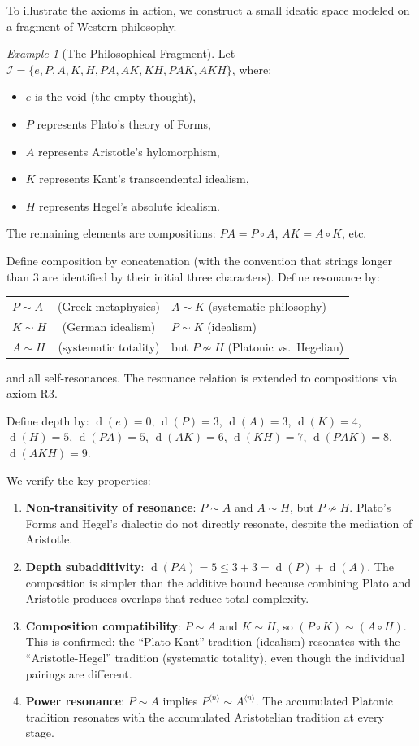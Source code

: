 \documentclass[11pt,openany]{book}
\theoremstyle{definition}
\theoremstyle{plain}
\theoremstyle{remark}
\newtheorem{example}[axiom]{Example}
\newcommand{\IS}{\mathcal{I}}               %
\newcommand{\compose}{\circ}                 %
\newcommand{\res}{\sim}                      %
\newcommand{\depth}{\operatorname{d}}       %
\newcommand{\compN}[2]{#1^{\langle #2 \rangle}} %
\begin{document}
To illustrate the axioms in action, we construct a small ideatic space modeled on a fragment of Western philosophy.

\begin{example}[The Philosophical Fragment]
\label{ex:philosophy}
Let $\IS = \{e, P, A, K, H, PA, AK, KH, PAK, AKH\}$, where:
\begin{itemize}
\item $e$ is the void (the empty thought),
\item $P$ represents Plato's theory of Forms,
\item $A$ represents Aristotle's hylomorphism,
\item $K$ represents Kant's transcendental idealism,
\item $H$ represents Hegel's absolute idealism.
\end{itemize}
The remaining elements are compositions: $PA = P \compose A$, $AK = A \compose K$, etc.

Define composition by concatenation (with the convention that strings longer than 3 are identified by their initial three characters). Define resonance by:
\begin{center}
\begin{tabular}{lcl}
$P \res A$ & (Greek metaphysics) & $A \res K$ (systematic philosophy) \\
$K \res H$ & (German idealism) & $P \res K$ (idealism) \\
$A \res H$ & (systematic totality) & but $P \not\res H$ (Platonic vs.\ Hegelian) \\
\end{tabular}
\end{center}
and all self-resonances. The resonance relation is extended to compositions via axiom R3.

Define depth by: $\depth(e) = 0$, $\depth(P) = 3$, $\depth(A) = 3$, $\depth(K) = 4$, $\depth(H) = 5$, $\depth(PA) = 5$, $\depth(AK) = 6$, $\depth(KH) = 7$, $\depth(PAK) = 8$, $\depth(AKH) = 9$.

We verify the key properties:
\begin{enumerate}
\item \textbf{Non-transitivity of resonance}: $P \res A$ and $A \res H$, but $P \not\res H$. Plato's Forms and Hegel's dialectic do not directly resonate, despite the mediation of Aristotle.
\item \textbf{Depth subadditivity}: $\depth(PA) = 5 \leq 3 + 3 = \depth(P) + \depth(A)$. The composition is simpler than the additive bound because combining Plato and Aristotle produces overlaps that reduce total complexity.
\item \textbf{Composition compatibility}: $P \res A$ and $K \res H$, so $(P \compose K) \res (A \compose H)$. This is confirmed: the ``Plato-Kant'' tradition (idealism) resonates with the ``Aristotle-Hegel'' tradition (systematic totality), even though the individual pairings are different.
\item \textbf{Power resonance}: $P \res A$ implies $\compN{P}{n} \res \compN{A}{n}$. The accumulated Platonic tradition resonates with the accumulated Aristotelian tradition at every stage.
\end{enumerate}
\end{example}
\end{document}
